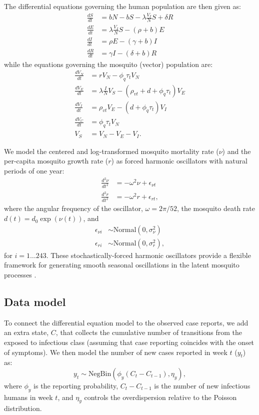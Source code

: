 \documentclass[10pt,letterpaper]{article}
\begin{document}
The differential equations governing the human population are then given as:
\begin{align} 
\frac{dS}{dt} &= bN - bS - \lambda \frac{V_{I}}{N} S + \delta R\\
\frac{dE}{dt} &= \lambda \frac{V_{I}}{N} S - (\rho + b)E\\
\frac{dI}{dt} &= \rho E - (\gamma + b)I\\
\frac{dR}{dt} &= \gamma I - (\delta + b)R
\end{align}
while the equations governing the mosquito (vector) population are:
\begin{align}
\frac{dV_N}{dt} & = r V_N - \phi_q \tau_t V_N \\
\frac{dV_E}{dt} &= \lambda \frac{I}{N} V_S - (\rho_{vt} + d + \phi_q \tau_t)V_E\\
\frac{dV_I}{dt} &= \rho_{vt} V_E - (d + \phi_q \tau_t) V_I\\
\frac{dV_C}{dt} & = \phi_q \tau_t V_N\\
V_S &= V_N - V_E - V_I.
\end{align}

We model the centered and log-transformed mosquito mortality rate ($\nu$) and the per-capita mosquito growth rate ($r$) as forced harmonic oscillators with natural periods of one year:
\begin{align}
\frac{d^2\nu}{dt^2} &= -\omega^2 \nu + \epsilon_{\nu t}\\
\frac{d^2 r}{dt^2} &= -\omega^2 r + \epsilon_{rt},
\end{align}
where the angular frequency of the oscillator, $\omega = 2\pi / 52$, the mosquito death rate $d(t) = d_0 \exp(\nu(t))$, and
\begin{align}
\epsilon_{\nu i} & \sim \text{Normal}(0, \sigma^2_{\nu})\\
\epsilon_{ri} & \sim \text{Normal}(0, \sigma^2_r),
\end{align}
for $i = 1 \dots 243$.
These stochastically-forced harmonic oscillators provide a flexible framework for generating smooth seasonal oscillations in the latent mosquito processes \cite{Ramsay2017}.

\subsection*{Data model}

To connect the differential equation model to the observed case reports, we add an extra state, $C$, that collects the cumulative number of transitions from the exposed to infectious class (assuming that case reporting coincides with the onset of symptoms).
We then model the number of new cases reported in week $t$ ($y_t$) as:
\begin{equation}
y_t  \sim \text{NegBin}(\phi_y (C_t - C_{t-1}), \eta_y),
\end{equation}
where $\phi_y$ is the reporting probability, $C_t - C_{t-1}$ is the number of new infectious humans in week $t$, and $\eta_y$ controls the overdispersion relative to the Poisson distribution.
\end{document}
